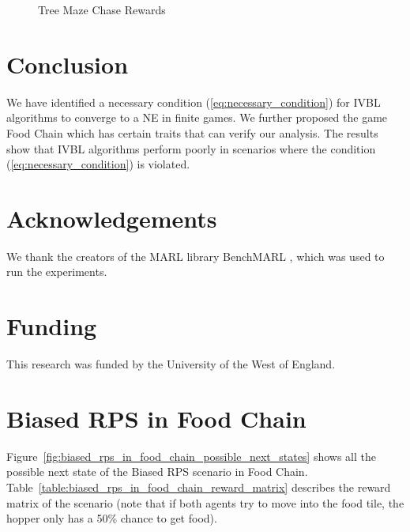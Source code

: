 \documentclass[]{interact}
\theoremstyle{plain}%
\theoremstyle{definition}
\theoremstyle{remark}
\begin{document}
\begin{figure}
\centering
{}
\caption{Tree Maze Chase Rewards}
\label{fig:tree_maze_chase_rewards}
\end{figure}

\section{Conclusion}
We have identified a necessary condition (\ref{eq:necessary_condition}) for IVBL algorithms to converge to a NE in finite games. We further proposed the game Food Chain which has certain traits that can verify our analysis. The results show that IVBL algorithms perform poorly in scenarios where the condition (\ref{eq:necessary_condition}) is violated.

\section*{Acknowledgements}
We thank the creators of the MARL library BenchMARL \cite{bettini2024benchmarl}, which was used to run the experiments.

\section*{Funding}
This research was funded by the University of the West of England.




\pagebreak
\appendix

\section{Biased RPS in Food Chain}
Figure~\ref{fig:biased_rps_in_food_chain_possible_next_states} shows all the possible next state of the Biased RPS scenario in Food Chain. Table~\ref{table:biased_rps_in_food_chain_reward_matrix} describes the reward matrix of the scenario (note that if both agents try to move into the food tile, the hopper only has a 50\% chance to get food).
\end{document}
